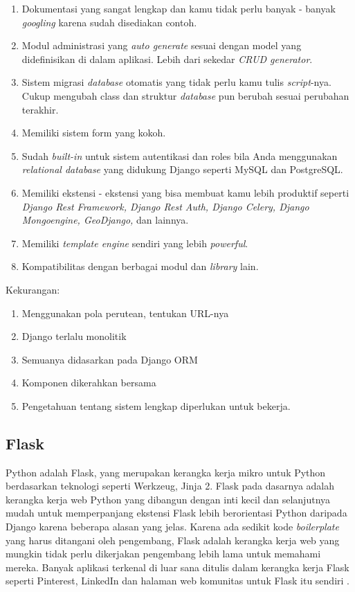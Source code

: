 \begin{enumerate}
\item Dokumentasi yang sangat lengkap dan kamu tidak perlu banyak - banyak \textit{googling} karena sudah disediakan contoh.
\item Modul administrasi yang \textit{auto generate} sesuai dengan model yang didefinisikan di dalam aplikasi. Lebih dari sekedar \textit{CRUD generator}.
\item Sistem migrasi \textit{database} otomatis yang tidak perlu kamu tulis \textit{script}-nya. Cukup mengubah class dan struktur \textit{database} pun berubah sesuai perubahan terakhir.
\item Memiliki sistem form yang kokoh.
\item Sudah \textit{built-in} untuk sistem autentikasi dan roles bila Anda menggunakan \textit{relational database} yang didukung Django seperti MySQL dan PostgreSQL.
\item Memiliki ekstensi - ekstensi yang bisa membuat kamu lebih produktif seperti \textit{Django Rest Framework, Django Rest Auth, Django Celery, Django Mongoengine, GeoDjango,} dan lainnya.
\item Memiliki \textit{template engine} sendiri yang lebih \textit{powerful}.
\item Kompatibilitas dengan berbagai modul dan \textit{library} lain.
\end{enumerate}

Kekurangan:
\begin{enumerate}
\item Menggunakan pola perutean, tentukan URL-nya
\item Django terlalu monolitik
\item Semuanya didasarkan pada Django ORM
\item Komponen dikerahkan bersama
\item Pengetahuan tentang sistem lengkap diperlukan untuk bekerja.
\end{enumerate}

\subsection{Flask}

Python adalah Flask, yang merupakan kerangka kerja mikro untuk Python berdasarkan teknologi seperti Werkzeug, Jinja 2. Flask pada dasarnya adalah kerangka kerja web Python yang dibangun dengan inti kecil dan selanjutnya mudah untuk memperpanjang ekstensi Flask lebih berorientasi Python daripada Django karena beberapa alasan yang jelas. Karena ada sedikit kode \textit{boilerplate} yang harus ditangani oleh pengembang, Flask adalah kerangka kerja web yang mungkin tidak perlu dikerjakan pengembang lebih lama untuk memahami mereka. Banyak aplikasi terkenal di luar sana ditulis dalam kerangka kerja Flask seperti Pinterest, LinkedIn dan halaman web komunitas untuk Flask itu sendiri \cite{ramdani2018clustering}.

